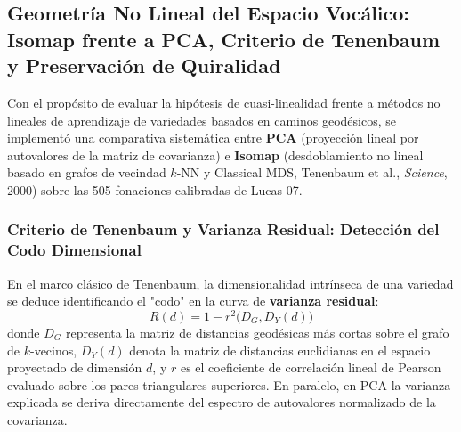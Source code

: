 \documentclass[11pt,a4paper,openany]{book}
\theoremstyle{definition}
\begin{document}
\subsection{Geometría No Lineal del Espacio Vocálico: Isomap frente a PCA, Criterio de Tenenbaum y Preservación de Quiralidad}
\label{subsec:isomap_vs_pca_quiralidad}

Con el propósito de evaluar la hipótesis de cuasi-linealidad frente a métodos no lineales de aprendizaje de variedades basados en caminos geodésicos, se implementó una comparativa sistemática entre \textbf{PCA} (proyección lineal por autovalores de la matriz de covarianza) e \textbf{Isomap} (desdoblamiento no lineal basado en grafos de vecindad $k$-NN y Classical MDS, Tenenbaum et al., \textit{Science}, 2000) sobre las 505 fonaciones calibradas de Lucas 07.

\subsubsection{Criterio de Tenenbaum y Varianza Residual: Detección del Codo Dimensional}
\label{subsubsec:criterio_tenenbaum_varianza}

En el marco clásico de Tenenbaum, la dimensionalidad intrínseca de una variedad se deduce identificando el "codo" en la curva de \textbf{varianza residual}:
\begin{equation}
R(d) = 1 - r^2\big(D_G, D_Y(d)\big)
\end{equation}
donde $D_G$ representa la matriz de distancias geodésicas más cortas sobre el grafo de $k$-vecinos, $D_Y(d)$ denota la matriz de distancias euclidianas en el espacio proyectado de dimensión $d$, y $r$ es el coeficiente de correlación lineal de Pearson evaluado sobre los pares triangulares superiores. En paralelo, en PCA la varianza explicada se deriva directamente del espectro de autovalores normalizado de la covarianza.
\end{document}
